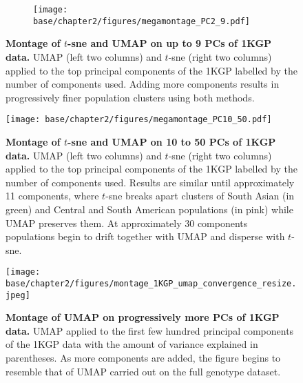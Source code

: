 \begin{figure}[!ht]
    \centering
    \begin{subfigure}{\textwidth}
    \texttt{[image: base/chapter2/figures/megamontage\_PC2\_9.pdf]}
    \end{subfigure}
    \caption[Montage of $t$-sne and UMAP on up to 9 PCs of 1KGP data]{\textbf{Montage of $t$-sne and UMAP on up to 9 PCs of 1KGP data.} UMAP (left two columns) and $t$-sne (right two columns) applied to the top principal components of the 1KGP labelled by the number of components used. Adding more components results in progressively finer population clusters using both methods.}
    \label{fig:supp_megamontage_pc2_9}  
\end{figure}

\newpage

\begin{figure}[ht]
    \centering
    \texttt{[image: base/chapter2/figures/megamontage\_PC10\_50.pdf]}
    \caption[Montage of $t$-sne and UMAP on 10 to 50 PCs of 1KGP data]{\textbf{Montage of $t$-sne and UMAP on 10 to 50 PCs of 1KGP data.} UMAP (left two columns) and $t$-sne (right two columns) applied to the top principal components of the 1KGP labelled by the number of components used. Results are similar until approximately 11 components, where $t$-sne breaks apart clusters of South Asian (in green) and Central and South American populations (in pink) while UMAP preserves them. At approximately 30 components populations begin to drift together with UMAP and disperse with $t$-sne.}
    \label{fig:supp_megamontage_pc10_50}
\end{figure}

\newpage

\begin{figure}[ht]
    \centering
    \texttt{[image: base/chapter2/figures/montage\_1KGP\_umap\_convergence\_resize.jpeg]}
    \caption[Montage of UMAP on progressively more PCs of 1KGP data]{\textbf{Montage of UMAP on progressively more PCs of 1KGP data.} UMAP applied to the first few hundred principal components of the 1KGP data with the amount of variance explained in parentheses. As more components are added, the figure begins to resemble that of UMAP carried out on the full genotype dataset.}
    \label{fig:supp_montage_1kgp_converge}
\end{figure}

